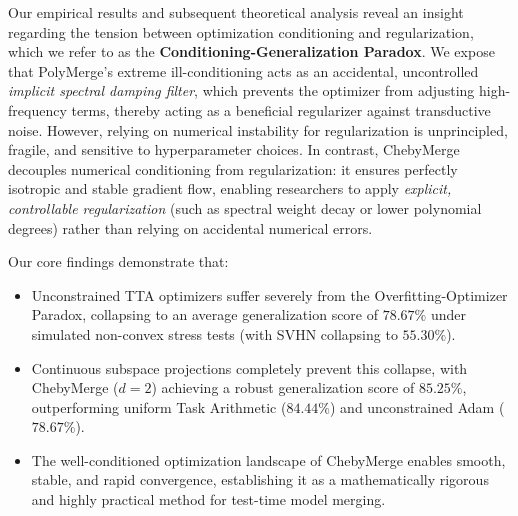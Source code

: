 Our empirical results and subsequent theoretical analysis reveal an insight regarding the tension between optimization conditioning and regularization, which we refer to as the \textbf{Conditioning-Generalization Paradox}. We expose that PolyMerge's extreme ill-conditioning acts as an accidental, uncontrolled \emph{implicit spectral damping filter}, which prevents the optimizer from adjusting high-frequency terms, thereby acting as a beneficial regularizer against transductive noise. However, relying on numerical instability for regularization is unprincipled, fragile, and sensitive to hyperparameter choices. In contrast, ChebyMerge decouples numerical conditioning from regularization: it ensures perfectly isotropic and stable gradient flow, enabling researchers to apply \emph{explicit, controllable regularization} (such as spectral weight decay or lower polynomial degrees) rather than relying on accidental numerical errors. 

Our core findings demonstrate that:
\begin{itemize}
    \item Unconstrained TTA optimizers suffer severely from the Overfitting-Optimizer Paradox, collapsing to an average generalization score of $78.67\%$ under simulated non-convex stress tests (with SVHN collapsing to $55.30\%$).
    \item Continuous subspace projections completely prevent this collapse, with ChebyMerge ($d=2$) achieving a robust generalization score of $85.25\%$, outperforming uniform Task Arithmetic ($84.44\%$) and unconstrained Adam ($78.67\%$).
    \item The well-conditioned optimization landscape of ChebyMerge enables smooth, stable, and rapid convergence, establishing it as a mathematically rigorous and highly practical method for test-time model merging.
\end{itemize}
